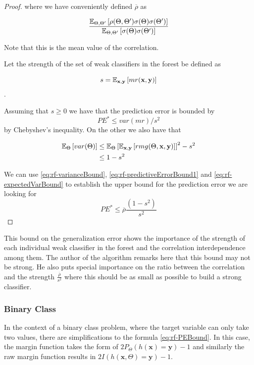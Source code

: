 \begin{proof}
	where we have conveniently defined $\overline{\rho}$ as
	
	\[\label{eq:rf-meanCorrelation}
	\frac{\operatorname{\mathbb{E}}_{\Theta, \Theta'} \left[ \rho(\Theta, \Theta') \sigma(\Theta) \sigma(\Theta')\right]}
	{\operatorname{\mathbb{E}}_{\Theta, \Theta'} \left[ \sigma(\Theta) \sigma(\Theta')\right]}
	\]
	
	Note that this is the mean value of the correlation.
	
	Let the strength of the set of weak classifiers in the forest be defined as
	
	\[
	s =  \operatorname{\mathbb{E}}_{\textbf{x},\textbf{y}} \left[ mr(\textbf{x},\textbf{y} ) \right] 
	\].\label{eq:rf-strength}
	
	Assuming that $s \geq 0$ we have that the prediction error is bounded by
	\[\label{eq:rf-predictiveErrorBound1}
	PE^* \leq var(mr)/s^2
	\]
	by Chebyshev's inequality. On the other we also have that
	
	
	\[\label{eq:rf-expectedVarBound}
	\begin{split}
	\operatorname{\mathbb{E}}_{\Theta} \left[ var(\Theta) \right]  & \leq \operatorname{\mathbb{E}}_{\Theta} \left[ \operatorname{\mathbb{E}}_{\textbf{x},\textbf{y}}\left[ rmg(\Theta,\textbf{x},\textbf{y})   \right]  \right]^2 -s^2  \\
	& \leq 1-s^2
	\end{split}
	\]
	
	
	We can use  \ref{eq:rf-varianceBound}, \ref{eq:rf-predictiveErrorBound1} and \ref{eq:rf-expectedVarBound} to establish the upper bound for the prediction error we are looking for
	\[\label{eq:rf-PEBound}
	PE^* \leq \overline{\rho}\frac{(1-s^2)}{s^2}
	\]
\end{proof}


This bound on the generalization error shows the importance of the strength of each individual weak classifier in the forest and the correlation interdependence among them. The author of the algorithm \cite{breiman-randomforests} remarks here that this bound may not be strong. He also puts special importance on the ratio between the correlation and the strength $\frac{\overline{\rho}}{s^2}$ where this should be as small as possible to build a strong classifier.


\subsubsection{Binary Class}
In the context of a binary class problem, where the target variable can only take two values, there are simplifications to the formula \ref{eq:rf-PEBound}. In this case, the margin function takes the form of $2 P_{\Theta}(h(\textbf{x}) = \textbf{y}) -1$ and similarly the raw margin function results in $2 I(h(\textbf{x}, \Theta) = \textbf{y}) -1$.


